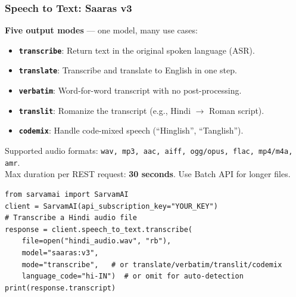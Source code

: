 \begin{frame}[fragile]\frametitle{Speech to Text: Saaras v3}
\textbf{Five output modes} --- one model, many use cases:
  \begin{itemize}
    \item \textbf{\texttt{transcribe}}: Return text in the original spoken language (ASR).
    \item \textbf{\texttt{translate}}: Transcribe and translate to English in one step.
    \item \textbf{\texttt{verbatim}}: Word-for-word transcript with no post-processing.
    \item \textbf{\texttt{translit}}: Romanize the transcript (e.g., Hindi $\to$ Roman script).
    \item \textbf{\texttt{codemix}}: Handle code-mixed speech (``Hinglish'', ``Tanglish'').
  \end{itemize}

Supported audio formats: \texttt{wav, mp3, aac, aiff, ogg/opus, flac, mp4/m4a, amr}.\\
Max duration per REST request: \textbf{30 seconds}. Use Batch API for longer files.

\begin{lstlisting}
from sarvamai import SarvamAI
client = SarvamAI(api_subscription_key="YOUR_KEY")
# Transcribe a Hindi audio file
response = client.speech_to_text.transcribe(
    file=open("hindi_audio.wav", "rb"),
    model="saaras:v3",
    mode="transcribe",   # or translate/verbatim/translit/codemix
    language_code="hi-IN")  # or omit for auto-detection
print(response.transcript)
\end{lstlisting}

\end{frame}

